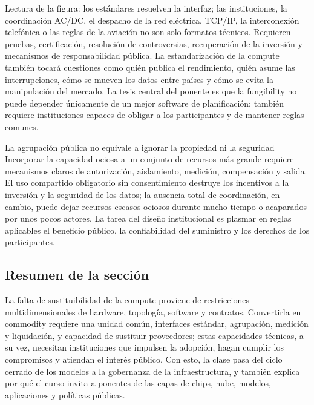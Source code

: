\documentclass[a4paper]{article}
\begin{document}
\begin{knowledgebox}{Lectura de la figura: los estándares resuelven la interfaz; las instituciones, la coordinación}
AC/DC, el despacho de la red eléctrica, TCP/IP, la interconexión telefónica o las reglas de la aviación no son solo formatos técnicos. Requieren pruebas, certificación, resolución de controversias, recuperación de la inversión y mecanismos de responsabilidad pública. La estandarización de la compute también tocará cuestiones como quién publica el rendimiento, quién asume las interrupciones, cómo se mueven los datos entre países y cómo se evita la manipulación del mercado. La tesis central del ponente es que la fungibility no puede depender únicamente de un mejor software de planificación; también requiere instituciones capaces de obligar a los participantes y de mantener reglas comunes.
\end{knowledgebox}

\begin{warningbox}{La agrupación pública no equivale a ignorar la propiedad ni la seguridad}
Incorporar la capacidad ociosa a un conjunto de recursos más grande requiere mecanismos claros de autorización, aislamiento, medición, compensación y salida. El uso compartido obligatorio sin consentimiento destruye los incentivos a la inversión y la seguridad de los datos; la ausencia total de coordinación, en cambio, puede dejar recursos escasos ociosos durante mucho tiempo o acaparados por unos pocos actores. La tarea del diseño institucional es plasmar en reglas aplicables el beneficio público, la confiabilidad del suministro y los derechos de los participantes.
\end{warningbox}

\subsection{Resumen de la sección}

La falta de sustituibilidad de la compute proviene de restricciones multidimensionales de hardware, topología, software y contratos. Convertirla en commodity requiere una unidad común, interfaces estándar, agrupación, medición y liquidación, y capacidad de sustituir proveedores; estas capacidades técnicas, a su vez, necesitan instituciones que impulsen la adopción, hagan cumplir los compromisos y atiendan el interés público. Con esto, la clase pasa del ciclo cerrado de los modelos a la gobernanza de la infraestructura, y también explica por qué el curso invita a ponentes de las capas de chips, nube, modelos, aplicaciones y políticas públicas.
\end{document}

